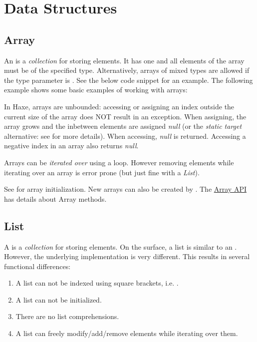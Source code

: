 \documentclass{haxe}
\begin{document}


\section{Data Structures}
\label{std-ds}

\subsection{Array}
\label{std-Array}

An  is a \emph{collection} for storing elements.  It has one  and all elements of the array must be of the specified type.  Alternatively, arrays of mixed types are allowed if the type parameter is .  See the below code snippet for an example. 
The following example shows some basic examples of working with arrays:

In Haxe, arrays are unbounded:  accessing or assigning an index outside the current size of the array does NOT result in an exception.  When assigning, the array grows and the inbetween elements are assigned \emph{null} (or the \emph{static target} alternative: see  for more details).  When accessing, \emph{null} is returned.  Accessing a negative index in an array also returns \emph{null}.

Arrays can be \emph{iterated over} using a  loop.  However removing elements while iterating over an array is error prone (but just fine with a \emph{List}).

See  for array initialization.  New arrays can also be created by .  The \href{http://api.haxe.org/Array.html}{Array API} has details about Array methods.


\subsection{List}
\label{std-List}
A  is a \emph{collection} for storing elements.  On the surface, a list is similar to an .  However, the underlying implementation is very different.  This results in several functional differences:
\begin{enumerate}
	\item A list can not be indexed using square brackets, i.e. \expr{[0]}.
	\item A list can not be initialized.
	\item There are no list comprehensions.
	\item A list can freely modify/add/remove elements while iterating over them.
\end{enumerate}
\end{document}
